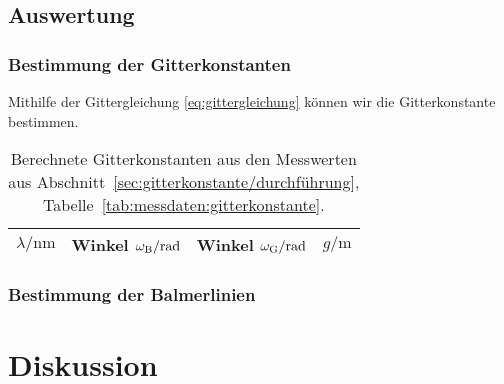 \FloatBarrier
\subsection{Auswertung}

\FloatBarrier
\subsubsection{Bestimmung der Gitterkonstanten}

Mithilfe der Gittergleichung \eqref{eq:gittergleichung} können wir die
Gitterkonstante bestimmen.

\begin{table}[htbp]
    \centering
    \begin{tabular}{SSS|S}
        {$\lambda / \si{\nano\meter}$} & {Winkel $\omega_\text B / \si\radian$}  & {Winkel
    $\omega_\text G / \si\radian$} & {$g / \si{\meter}$} \\
        \hline
    \end{tabular}
    \caption{%
        Berechnete Gitterkonstanten aus den Messwerten aus
        Abschnitt~\ref{sec:gitterkonstante/durchführung},
        Tabelle~\ref{tab:messdaten:gitterkonstante}.
    }
    \label{tab:gitterkonstanten}
\end{table}


\FloatBarrier
\subsubsection{Bestimmung der Balmerlinien}


\FloatBarrier
\section{Diskussion}


\FloatBarrier
